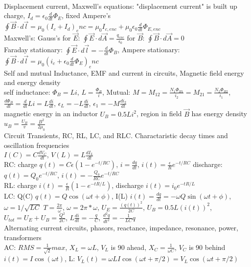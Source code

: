 \documentclass{article}
\begin{document}
\begin{large}
\\\indent Displacement current, Maxwell's equations:
"displacement current" is built up charge, $I_d=\epsilon_0\frac{d}{dt}\Phi_E$, fixed Ampere's $\oint\vec B\cdot d\vec l=\mu_0(I_c+I_d)_enc=\mu_0I_{c,enc}+\mu_0\epsilon_0\frac{d}{dt}\Phi_{E,enc}$
\\Maxwell's: Gauss's for $\vec E$: $\oint\vec E\cdot d\vec A=\frac{q_{enc}}{\epsilon_0}$ for $\vec B$: $\oint\vec B\cdot d\vec A=0$
\\Faraday stationary: $\oint\vec E\cdot d\vec l=-\frac{d}{dt}\Phi_B$, Ampere stationary: $\oint\vec B\cdot d\vec l=\mu_0(i_c+\epsilon_0\frac{d}{dt}\Phi_E)_enc$
\\\indent Self and mutual Inductance, EMF and current in circuits, Magnetic field energy and energy density
\\self inductance: $\Phi_B=Li$, $L=\frac{\Phi_B}{i}$, Mutual: $M=M_{12}=\frac{N_1\Phi_{B1}}{i_2}=M_{21}=\frac{N_2\Phi_{B2}}{i_1}$, $\frac{d\Phi_B}{dt}=\frac{d}{dt}Li=L\frac{di}{dt}$, $\epsilon_L=-L\frac{di}{dt}$, $\epsilon_1=-M\frac{di_2}{dt}$
\\magnetic energy in an inductor $U_B=0.5Li^2$, region in field $\vec B$ has energy density $u_B=\frac{U_B}{v}=\frac{B^2}{2\mu_0}$
\\\indent Circuit Transients, RC, RL, LC, and RLC. Charactaristic decay times and oscillation frequencies
\\$I(C)=C\frac{dV_C}{dt}$, $V(L)=L\frac{dI_L}{dt}$
\\RC: charge $q(t)=C\epsilon(1-e^{-t/RC})$, $i=\frac{dq}{dt}$, $i(t)=\frac{\epsilon}{R}e^{-t/RC}$ discharge: $q(t)=Q_0e^{-t/RC}$, $i(t)=-\frac{Q_0}{RC}e^{-t/RC}$
\\RL: charge $i(t)=\frac{\epsilon}{R}(1-e^{-tR/L})$, discharge $i(t)=i_0e^{-tR/L}$
\\LC: Q(C) $q(t)=Q\cos(\omega t+\phi)$, I(L) $i(t)=\frac{dq}{dt}=-\omega Q\sin(\omega t+\phi)$, $\omega=1/\sqrt{LC}$ $T=\frac{2\pi}{\omega}$, $\omega=2\pi*\omega$, $U_E=\frac{(q(t))^2}{2C}$, $U_B=0.5L(i(t))^2$, $U_{tot}=U_E+U_B=\frac{Q^2}{2C}$, $L\frac{di}{dt}=-\frac{q}{C}$, $\frac{d^2q}{dt^2}=-\frac{1}{LC}q$
\\\indent Alternating current circuits, phasors, reactance, impedance, resonance, power, transformers
\\AC: $RMS=\frac{1}{\sqrt{2}} max$, $X_L=\omega L$, $V_L$ is 90 ahead, $X_C=\frac{1}{\omega C}$, $V_C$ is 90 behind
\\$i(t)=I\cos(\omega t)$,  L: $V_L(t)=\omega LI\cos(\omega t+\pi/2)=V_L\cos(\omega t+\pi/2)$

\end{large}
\end{document}
